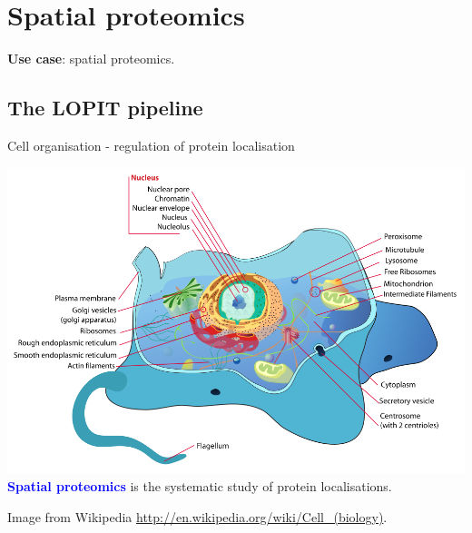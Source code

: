 \section{Spatial proteomics}

\begin{frame}{}
  \begin{center}
    \Large{\textbf{Use case}: spatial proteomics.}
  \end{center}
\end{frame}

\subsection*{The LOPIT pipeline}

\label{sec:spintro}


\label{sec:spspatprot}

\begin{frame}{Cell organisation - regulation of protein localisation}
  \begin{center}
    \includegraphics[width=1\linewidth]{figs_all/Animal_cell_structure.png} \\
    \textbf{\textcolor{Blue}{Spatial proteomics}} is the systematic
    study of protein localisations.
  \end{center}

  \tiny Image from Wikipedia
  \url{http://en.wikipedia.org/wiki/Cell_(biology)}.
\end{frame}

